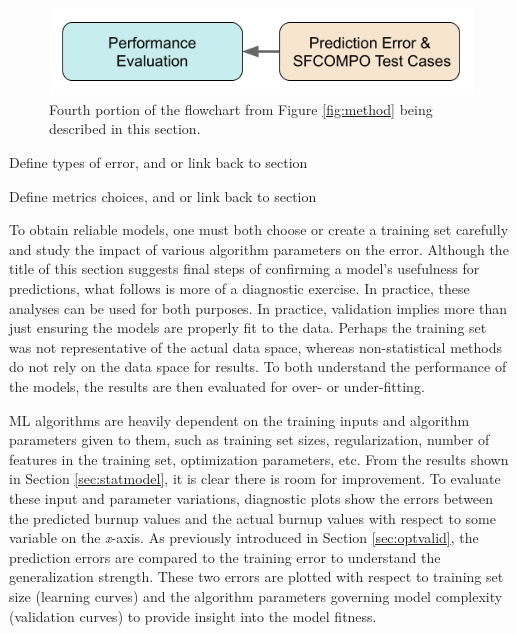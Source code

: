 
\begin{figure}[H]
  \centering
  \includegraphics[width=0.7\linewidth]{./chapters/method/methodology4.png}
  \caption{Fourth portion of the flowchart from Figure \ref{fig:method} being 
           described in this section.}
\end{figure}

Define types of error, and or link back to section

Define metrics choices, and or link back to section

To obtain reliable models, one must both choose or create a training set
carefully and study the impact of various algorithm parameters on the error.
Although the title of this section suggests final steps of confirming a model's
usefulness for predictions, what follows is more of a diagnostic exercise. 
In practice, these analyses can be used for both purposes.
In practice, validation implies more than just
ensuring the models are properly fit to the data.  Perhaps the training set was
not representative of the actual data space, whereas non-statistical methods do
not rely on the data space for results. To both understand the performance of
the models, the results are then evaluated for over- or under-fitting. 

\gls{ML} algorithms are heavily dependent on the training inputs and algorithm
parameters given to them, such as training set sizes, regularization, number of
features in the training set, optimization parameters, etc.  From the results
shown in Section \ref{sec:statmodel}, it is clear there is room for
improvement.  To evaluate these input and parameter variations, diagnostic
plots show the errors between the predicted burnup values and the actual burnup
values with respect to some variable on the \textit{x}-axis.  As previously
introduced in Section \ref{sec:optvalid}, the prediction errors are compared to
the training error to understand the generalization strength. These two errors
are plotted with respect to training set size (learning curves) and the
algorithm parameters governing model complexity (validation curves) to provide
insight into the model fitness. 

